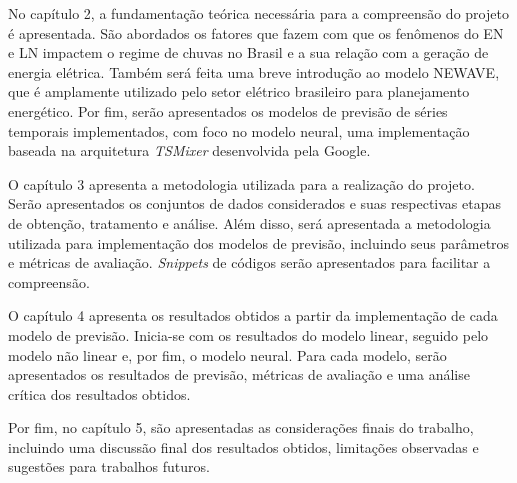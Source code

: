 No capítulo 2, a fundamentação teórica necessária para a compreensão do projeto é apresentada. São abordados os fatores
que fazem com que os fenômenos do EN e LN impactem o regime de chuvas no Brasil e a sua relação com a geração de 
energia elétrica. Também será feita uma breve introdução ao modelo NEWAVE, que é amplamente utilizado pelo setor elétrico
brasileiro para planejamento energético. Por fim, serão apresentados os modelos de previsão de séries temporais 
implementados, com foco no modelo neural, uma implementação baseada na arquitetura \textit{TSMixer} desenvolvida pela Google.

O capítulo 3 apresenta a metodologia utilizada para a realização do projeto. Serão apresentados os conjuntos de dados
considerados e suas respectivas etapas de obtenção, tratamento e análise. Além disso, será apresentada a metodologia
utilizada para implementação dos modelos de previsão, incluindo seus parâmetros e métricas de avaliação. \textit{Snippets}
de códigos serão apresentados para facilitar a compreensão.

O capítulo 4 apresenta os resultados obtidos a partir da implementação de cada modelo de previsão. Inicia-se com os resultados
do modelo linear, seguido pelo modelo não linear e, por fim, o modelo neural. Para cada modelo, serão apresentados os
resultados de previsão, métricas de avaliação e uma análise crítica dos resultados obtidos.

Por fim, no capítulo 5, são apresentadas as considerações finais do trabalho, incluindo uma discussão final dos resultados
obtidos, limitações observadas e sugestões para trabalhos futuros.



